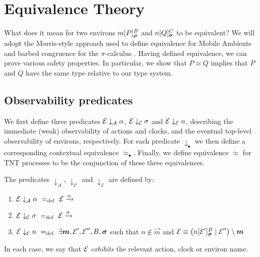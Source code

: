 \documentclass[orivec]{llncs}
\newcommand{\Exhibits}[1]{\mathrel{\downarrow_{#1}}}
\newcommand{\ExhibitsA}{\Exhibits{\mathcal{A}}}
\newcommand{\ExhibitsC}{\Exhibits{\mathcal{C}}}
\newcommand{\ExhibitsE}{\Exhibits{\mathcal{E}}}
\newcommand{\Eq}{\approx}
\newcommand{\Means}{\mathrel{~=_{\mathrm{def}}~}}
\newcommand{\Does}[1]{\xrightarrow{#1}}
\begin{document}
\section{Equivalence Theory}
\label{sec:equivalence-theory}

What does it mean for two environs $\locv{m}{P}{B}{\vec\rho}$ and
$\locv{n}{Q}{C}{\vec\sigma}$ to be equivalent? We will adopt the Morris-style
approach \cite{Mor68} used to define equivalence for Mobile Ambients \cite{GC99}
and barbed congruence for the $\pi$-calculus \cite{SW01}. Having defined
equivalence, we can prove various safety properties. In particular, we show that
$P \Eq Q$ implies that $P$ and $Q$ have the same type relative to our type
system.

\subsection{Observability predicates}
\label{sec:observability-predicates}

We first define three predicates $\expr \ExhibitsA \alpha$, $\expr \ExhibitsC
\sigma$ and $\expr \ExhibitsE n$, describing the immediate (weak) observability
of actions and clocks, and the eventual top-level observability of environs,
respectively. For each predicate $\Exhibits{\bullet}$ we then define a
corresponding contextual equivalence $\Eq_{\bullet}$. Finally, we define
equivalence $\Eq$ for TNT processes to be the conjunction of these three
equivalences.

\begin{definition}
The predicates $\ExhibitsA$, $\ExhibitsC$ and $\ExhibitsE$ are defined by:
\begin{enumerate}
\item
    $\expr \ExhibitsA \alpha \Means
      \expr \Does{\alpha}$
\item
    $\expr \ExhibitsC \sigma \Means
      \expr \Does{\sigma}$
\item
    $\expr \ExhibitsE n \Means
    \exists \vec{m},  \expr', \expr'', B, \vec{\sigma}$
    such that
    $ n \not\in \vec{m}$
    and
    $\expr \equiv 
     \left( \locv{n}{\expr'}{B}{\vec\sigma} \mid \expr'' \right) \res{\vec{m}} $
\end{enumerate}
In each case, we say that $\text{$\mathcal{E}$}$ \emph{exhibits} the relevant action, clock or environ name.
\end{definition}
\end{document}
